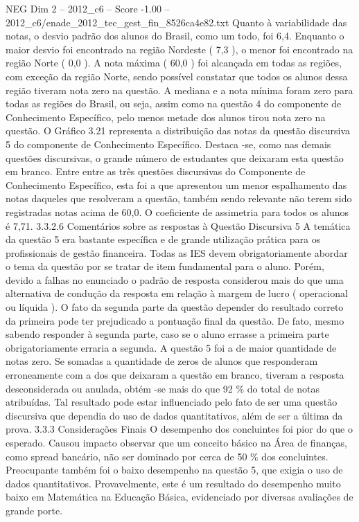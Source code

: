 \begin{textsample}{NEG Dim 2 – 2012\_c6 – Score -1.00 – 2012\_c6/enade\_2012\_tec\_gest\_fin\_8526ca4e82.txt}
Quanto à variabilidade das notas, o desvio padrão dos alunos do Brasil, como um todo, foi 6,4.
Enquanto o maior desvio foi encontrado na região Nordeste ( 7,3 ), o menor foi encontrado na região Norte ( 0,0 ).
A nota máxima ( 60,0 ) foi alcançada em todas as regiões, com exceção da região Norte, sendo possível constatar que todos os alunos dessa região tiveram nota zero na questão.
A mediana e a nota mínima foram zero para todas as regiões do Brasil, ou seja, assim como na questão 4 do componente de Conhecimento Específico, pelo menos metade dos alunos tirou nota zero na questão.
O Gráfico 3.21 representa a distribuição das notas da questão discursiva 5 do componente de Conhecimento Específico.
Destaca -se, como nas demais questões discursivas, o grande número de estudantes que deixaram esta questão em branco.
Entre entre as três questões discursivas do Componente de Conhecimento Específico, esta foi a que apresentou um menor espalhamento das notas daqueles que resolveram a questão, também sendo relevante não terem sido registradas notas acima de 60,0.
O coeficiente de assimetria para todos os alunos é 7,71. 3.3.2.6 Comentários sobre as respostas à Questão Discursiva 5 A temática da questão 5 era bastante específica e de grande utilização prática para os profissionais de gestão financeira.
Todas as IES devem obrigatoriamente abordar o tema da questão por se tratar de item fundamental para o aluno.
Porém, devido a falhas no enunciado o padrão de resposta considerou mais do que uma alternativa de condução da resposta em relação à margem de lucro ( operacional ou líquida ).
O fato da segunda parte da questão depender do resultado correto da primeira pode ter prejudicado a pontuação final da questão.
De fato, mesmo sabendo responder à segunda parte, caso se o aluno errasse a primeira parte obrigatoriamente erraria a segunda.
A questão 5 foi a de maior quantidade de notas zero.
Se somadas a quantidade de zeros de alunos que responderam erroneamente com a dos que deixaram a questão em branco, tiveram a resposta desconsiderada ou anulada, obtém -se mais do que 92 \% do total de notas atribuídas.
Tal resultado pode estar influenciado pelo fato de ser uma questão discursiva que dependia do uso de dados quantitativos, além de ser a última da prova. 3.3.3 Considerações Finais O desempenho dos concluintes foi pior do que o esperado.
Causou impacto observar que um conceito básico na Área de finanças, como spread bancário, não ser dominado por cerca de 50 \% dos concluintes.
Preocupante também foi o baixo desempenho na questão 5, que exigia o uso de dados quantitativos.
Provavelmente, este é um resultado do desempenho muito baixo em Matemática na Educação Básica, evidenciado por diversas avaliações de grande porte.

\end{textsample}
